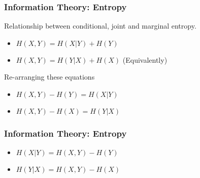 ﻿\documentclass[a4]{beamer}
\begin{document}

\begin{frame}
\frametitle{Information Theory: Entropy}
\Large
\vspace{-0.5cm}
Relationship between conditional, joint and marginal entropy.
\begin{itemize}
\item $H(X,Y)=H(X|Y)+H(Y) $
\item $H(X,Y)=H(Y|X)+H(X) $    (Equivalently)
\end{itemize}
\bigskip
Re-arranging these equations
\begin{itemize}
\item $H(X,Y)-H(Y) = H(X|Y) $
\item $H(X,Y)-H(X) = H(Y|X) $
\end{itemize}
\end{frame}

\begin{frame}
\frametitle{Information Theory: Entropy}
\Large
\vspace{-1.8cm}
\begin{itemize}
\item $H(X|Y) = H(X,Y)-H(Y)$
\bigskip\vspace{1.5cm}
\item $H(Y|X) = H(X,Y)-H(X)$ 
\end{itemize}
\bigskip

\end{frame}
\end{document}
